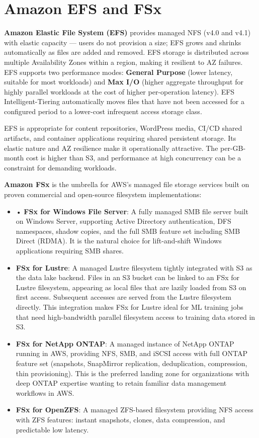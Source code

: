 \section{Amazon EFS and FSx}
\textbf{Amazon Elastic File System (EFS)} provides managed NFS (v4.0 and v4.1) with elastic capacity --- users do not provision a size; EFS grows and shrinks automatically as files are added and removed. EFS storage is distributed across multiple Availability Zones within a region, making it resilient to AZ failures. EFS supports two performance modes: \textbf{General Purpose} (lower latency, suitable for most workloads) and \textbf{Max I/O} (higher aggregate throughput for highly parallel workloads at the cost of higher per-operation latency). EFS Intelligent-Tiering automatically moves files that have not been accessed for a configured period to a lower-cost infrequent access storage class.

EFS is appropriate for content repositories, WordPress media, CI/CD shared artifacts, and container applications requiring shared persistent storage. Its elastic nature and AZ resilience make it operationally attractive. The per-GB-month cost is higher than S3, and performance at high concurrency can be a constraint for demanding workloads.

\textbf{Amazon FSx} is the umbrella for AWS's managed file storage services built on proven commercial and open-source filesystem implementations:

\begin{itemize}
  \item • \textbf{FSx for Windows File Server}: A fully managed SMB file server built on Windows Server, supporting Active Directory authentication, DFS namespaces, shadow copies, and the full SMB feature set including SMB Direct (RDMA). It is the natural choice for lift-and-shift Windows applications requiring SMB shares.
  \item \textbf{FSx for Lustre}: A managed Lustre filesystem tightly integrated with S3 as the data lake backend. Files in an S3 bucket can be linked to an FSx for Lustre filesystem, appearing as local files that are lazily loaded from S3 on first access. Subsequent accesses are served from the Lustre filesystem directly. This integration makes FSx for Lustre ideal for ML training jobs that need high-bandwidth parallel filesystem access to training data stored in S3.
  \item \textbf{FSx for NetApp ONTAP}: A managed instance of NetApp ONTAP running in AWS, providing NFS, SMB, and iSCSI access with full ONTAP feature set (snapshots, SnapMirror replication, deduplication, compression, thin provisioning). This is the preferred landing zone for organizations with deep ONTAP expertise wanting to retain familiar data management workflows in AWS.
  \item \textbf{FSx for OpenZFS}: A managed ZFS-based filesystem providing NFS access with ZFS features: instant snapshots, clones, data compression, and predictable low latency.
\end{itemize}

